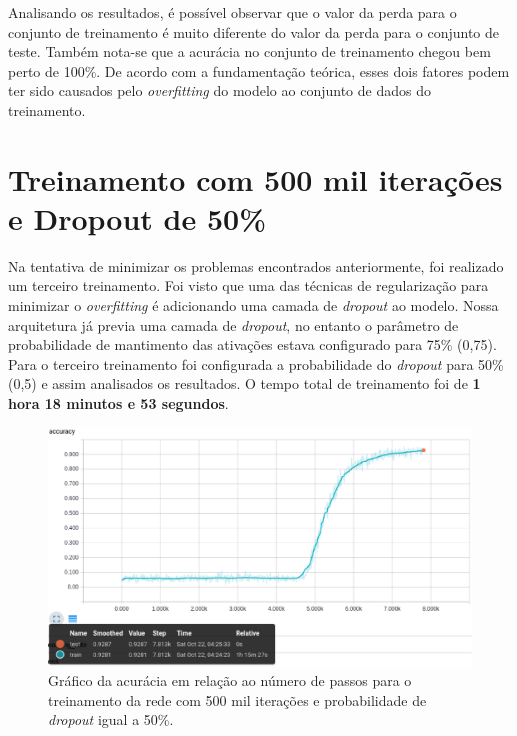 Analisando os resultados, é possível observar que o valor da perda
para o conjunto de treinamento é muito diferente do valor da perda
para o conjunto de teste. Também nota-se que a acurácia no conjunto de
treinamento chegou bem perto de 100\%. De acordo com a fundamentação
teórica, esses dois fatores podem ter sido causados pelo
\textit{overfitting} do modelo ao conjunto de dados do treinamento.

\section{Treinamento com 500 mil iterações e Dropout de 50\%}

Na tentativa de minimizar os problemas encontrados anteriormente, foi
realizado um terceiro treinamento. Foi visto que uma das técnicas de
regularização para minimizar o \textit{overfitting} é adicionando uma
camada de \textit{dropout} ao modelo. Nossa arquitetura já previa uma
camada de \textit{dropout}, no entanto o parâmetro de probabilidade de
mantimento das ativações estava configurado para 75\% (0,75). Para o
terceiro treinamento foi configurada a probabilidade do
\textit{dropout} para 50\% (0,5) e assim analisados os resultados. O
tempo total de treinamento foi de {\bf 1 hora 18 minutos e 53
  segundos}.


\begin{figure}[H]
\centering
\includegraphics[scale=0.4]{imagens/accuracy_500k_dropout50}
\caption{Gráfico da acurácia em relação ao número de passos para o
  treinamento da rede com 500 mil iterações e probabilidade de
  \textit{dropout} igual a 50\%.}
\label{fig:accuracy_500k_dropout50}
\end{figure}

